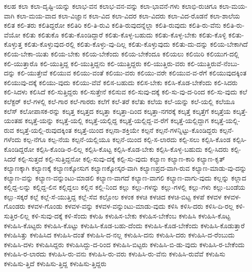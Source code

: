 {ಕಲಹ
ಕಲಾ
ಕಲಾ-ದೃಷ್ಟಿ-ಯನ್ನು
ಕಲಾಭ-ವನ
ಕಲಾಭ-ವನ-ವನ್ನು
ಕಲಾ-ಭಾವನೆ-ಗಳು
ಕಲಾಭಿ-ರುಚಿಗೂ
ಕಲಾ-ಮಯ-ವಾಗಿ
ಕಲಾ-ಮಯ-ವಾದ
ಕಲಾ-ವಿಜ್ಞಾನ
ಕಲಾ-ವಿದ
ಕಲಾ-ವಿದರ
ಕಲಾ-ವಿದರು
ಕಲಾ-ವಿದ-ರೊಡನೆ
ಕಲಾ-ಶಾಲೆಯ
ಕಲಿತ
ಕಲಿ-ತರು
ಕಲಿತಿದ್ದರೋ
ಕಲಿತಿರಿ
ಕಲಿ-ತಿ-ರುವಿ
ಕಲಿತಿ-ರುವುದನ್ನೆಲ್ಲಾ
ಕಲಿತಿ-ರುವುದು
ಕಲಿತಿ-ರು-ವೆನು
ಕಲಿತಿ-ರು-ವೆಯೋ
ಕಲಿತು
ಕಲಿತುಕೊ
ಕಲಿತು-ಕೊಂಡಿದ್ದಾರೆ
ಕಲಿತು-ಕೊಳ್ಳ-ಬಹುದು
ಕಲಿತು-ಕೊಳ್ಳ-ಬೇಕು
ಕಲಿತು-ಕೊಳ್ಳಿ
ಕಲಿತು-ಕೊಳ್ಳುತ್ತ
ಕಲಿತು-ಕೊಳ್ಳುವುದ-ರಲ್ಲಿ
ಕಲಿತು-ಕೊಳ್ಳು-ವು-ದಿಲ್ಲ
ಕಲಿತು-ಕೊಳ್ಳುವುದು
ಕಲಿತು-ದು-ದನ್ನು
ಕಲಿಯ-ಬೇಕಾಗಿದೆ
ಕಲಿಯ-ಬೇಕಾ-ಯಿತು
ಕಲಿಯ-ಬೇಕು
ಕಲಿಯ-ಬೇಕೆಂದು
ಕಲಿಯ-ಬೇಕೆಂದೂ
ಕಲಿಯಲು
ಕಲಿಯಿರಿ
ಕಲಿಯುಗ-ದಲ್ಲಿ
ಕಲಿ-ಯುತ್ತಾರೊ
ಕಲಿ-ಯುತ್ತಿದ್ದ
ಕಲಿ-ಯುತ್ತಿದ್ದನು
ಕಲಿ-ಯುತ್ತಿದ್ದರು
ಕಲಿ-ಯುತ್ತಿರು-ವರು
ಕಲಿ-ಯುತ್ತಿರುವೆ-ನೆಂಬು-ದನ್ನು
ಕಲಿ-ಯುತ್ತೇವೆ
ಕಲಿಯುವ
ಕಲಿಯು-ವಂತೆ
ಕಲಿಯು-ವರು
ಕಲಿಯು-ವರೇ
ಕಲಿಯುವ-ವ-ರೆಗೆ
ಕಲಿಯುವುದಕ್ಕಿಂತ
ಕಲಿಯುವು-ದಕ್ಕೆ
ಕಲಿಯು-ವುದು
ಕಲಿಯು-ವೆವೆ
ಕಲಿಸ-ಬಹುದು
ಕಲಿಸ-ಬೇಕು
ಕಲಿಸಿ-ಕೊಡ-ಬೇಕೆಂದು
ಕಲಿ-ಸಿದರು
ಕಲಿ-ಸಿದಳು
ಕಲಿಸಿದೆ
ಕಲಿ-ಸುತ್ತಿದ್ದರು
ಕಲಿ-ಸುತ್ತೇನೆ
ಕಲಿಸುವ
ಕಲಿ-ಸುವು-ದಕ್ಕೆ
ಕಲಿ-ಸು-ವು-ದ-ರಿಂದ
ಕಲಿ-ಸು-ವುದು
ಕಲೆ
ಕಲೆಕ್ಟರ್
ಕಲೆ-ಗಳಲ್ಲಿ
ಕಲೆ-ಗಾರ
ಕಲೆ-ಗಾರರು
ಕಲೆಗೆ
ಕಲೆ-ತರೆ
ಕಲೆತು
ಕಲೆಯ
ಕಲೆ-ಯನ್ನು
ಕಲೆ-ಯಲ್ಲಿ
ಕಲೆಯೂ
ಕಲೆಸ್
ಕಲೋಪಾಸಕ-ರನ್ನು
ಕಲ್ಕತ್ತ
ಕಲ್ಕತ್ತದ
ಕಲ್ಕತ್ತಾ
ಕಲ್ಕತ್ತಾ-ದಿಂದ
ಕಲ್ಕತ್ತಾ-ನಗರಕ್ಕೆ
ಕಲ್ಕತ್ತೆ
ಕಲ್ಕತ್ತೆಗೆ
ಕಲ್ಕತ್ತೆಯ
ಕಲ್ಕತ್ತೆ-ಯಂತಹ
ಕಲ್ಕತ್ತೆ-ಯನ್ನು
ಕಲ್ಕತ್ತೆ-ಯಲ್ಲಿ
ಕಲ್ಕತ್ತೆ-ಯಲ್ಲಿದ್ದ
ಕಲ್ಕತ್ತೆ-ಯಲ್ಲಿದ್ದ-ವ-ರೆಗೆ
ಕಲ್ಕತ್ತೆ-ಯಲ್ಲಿದ್ದಾಗ
ಕಲ್ಕತ್ತೆ-ಯಲ್ಲಿ-ರುವ
ಕಲ್ಕತ್ತೆ-ಯಲ್ಲಿ-ರುವುದಕ್ಕಿಂತ
ಕಲ್ಕತ್ತೆ-ಯಿಂದ
ಕಲ್ಪನಾ-ಶಕ್ತಿಯೇ
ಕಲ್ಪನೆ
ಕಲ್ಪನೆ-ಗಳನ್ನಿಟ್ಟು-ಕೊಂಡಿದ್ದರು
ಕಲ್ಪನೆ-ಗಳೆಂದು
ಕಲ್ಪ-ನೆಗೂ
ಕಲ್ಪ-ನೆಯ
ಕಲ್ಪನೆ-ಯಲ್ಲಿಯೂ
ಕಲ್ಪನೆ-ಯಿಂದ
ಕಲ್ಪಿ-ಸ-ಲಾರದು
ಕಲ್ಪಿ-ಸಲು
ಕಲ್ಪಿಸಿ-ಕೊಂಡ
ಕಲ್ಪಿಸಿ-ಕೊಂಡಿದ್ದರೋ
ಕಲ್ಪಿಸಿ-ಕೊಂಡಿ-ರ-ಲಿಲ್ಲ
ಕಲ್ಪಿಸಿ-ಕೊಟ್ಟ
ಕಲ್ಪಿಸಿ-ಕೊಡ-ಬೇಕು
ಕಲ್ಪಿಸಿ-ಕೊಳ್ಳ-ಬಹುದು
ಕಲ್ಪಿ-ಸಿದರು
ಕಲ್ಪಿ-ಸಿದರೆ
ಕಲ್ಪಿ-ಸುತ್ತದೆ
ಕಲ್ಪಿ-ಸುತ್ತಿದ್ದನೋ
ಕಲ್ಪಿ-ಸುವು-ದಕ್ಕೆ
ಕಲ್ಪಿ-ಸು-ವುದು
ಕಲ್ಯಾಣ
ಕಲ್ಯಾಣ-ಕಾರಿ
ಕಲ್ಯಾಣ-ಕೃತ್
ಕಲ್ಯಾಣಕ್ಕಾಗಿ
ಕಲ್ಯಾಣಕ್ಕೆ
ಕಲ್ಯಾಣಕ್ಕೋಸುಗ
ಕಲ್ಯಾಣಕ್ಕೋಸ್ಕರ-ವಾಗಿ
ಕಲ್ಯಾಣಪ್ರದ-ವಾಗಿ-ರುವ
ಕಲ್ಯಾಣ-ಮಾಡು-ವು-ದನ್ನು
ಕಲ್ಯಾಣ-ವನ್ನು
ಕಲ್ಯಾಣ-ವನ್ನುಂಟು-ಮಾಡಲಿ
ಕಲ್ಯಾಣ-ವಾಗದೆ
ಕಲ್ಯಾಣ-ವಾಗಲಿ
ಕಲ್ಯಾಣ-ವಾಗು-ವುದು
ಕಲ್ಲನ್ನು
ಕಲ್ಲಾದ
ಕಲ್ಲಿದ್ದ-ಲನ್ನು
ಕಲ್ಲಿದ್ದ-ಲಿನ
ಕಲ್ಲಿದ್ದಲು
ಕಲ್ಲಿನ
ಕಲ್ಲಿ-ನಿಂದ
ಕಲ್ಲು
ಕಲ್ಲು-ಗಳನ್ನು
ಕಲ್ಲು-ಗಳಲ್ಲಿ
ಕಲ್ಲು-ಗಳು
ಕಲ್ಲು-ಬಂಡೆಯ
ಕಲ್ಲು-ಸಕ್ಕರೆ
ಕಲ್ಲೆ
ಕಲ್ಲೆ-ಸೆ-ಯುತ್ತಿದ್ದ
ಕಲ್ಲೆ-ಸೆವ
ಕಲ್ಲೋಲ
ಕಳಂಕ
ಕಳಚಿ
ಕಳಚಿದ
ಕಳಚಿ-ಬಿಟ್ಟ
ಕಳಪೆ
ಕಳವಳ
ಕಳವಳ-ಗೊಂಡರು
ಕಳವಳ-ಗೊಂಡು
ಕಳವಳ-ವನ್ನು
ಕಳವಳ-ವನ್ನುಂಟು-ಮಾಡು-ವುದು
ಕಳಿಸಿ
ಕಳಿಸಿ-ದರು
ಕಳಿಸಿ-ದಿ-ರಲ್ಲ
ಕಳಿ-ಸುತ್ತಿರ-ಲಿಲ್ಲ
ಕಳಿ-ಸುವು-ದಕ್ಕೆ
ಕಳಿ-ಸೆಂದು
ಕಳುಹಿ
ಕಳುಹಿಸ-ಬೇಕು
ಕಳುಹಿಸ-ಬೇಕೆಂಬ
ಕಳುಹಿಸಿ
ಕಳುಹಿಸಿ-ಕೊಟ್ಟ
ಕಳುಹಿಸಿ-ಕೊಟ್ಟರು
ಕಳುಹಿಸಿ-ಕೊಟ್ಟು
ಕಳುಹಿಸಿ-ಕೊಡ-ಬಹು-ದೆಂದು
ಕಳುಹಿಸಿ-ಕೊಡ-ಬೇಕೆಂದು
ಕಳುಹಿಸಿ-ಕೊಡುತ್ತಾರೆ
ಕಳುಹಿಸಿತ್ತು
ಕಳುಹಿಸಿದ
ಕಳುಹಿಸಿ-ದಂತೆ
ಕಳುಹಿಸಿ-ದ-ನಲ್ಲ
ಕಳುಹಿಸಿ-ದನು
ಕಳುಹಿಸಿ-ದರು
ಕಳುಹಿಸಿ-ದ-ರೆಂಬುದು
ಕಳುಹಿಸಿ-ದಳು
ಕಳುಹಿಸಿದ್ದರು
ಕಳುಹಿಸಿದ್ದು-ದ-ರಿಂದ
ಕಳುಹಿಸಿ-ಬಿಟ್ಟರು
ಕಳುಹಿಸಿ-ಬಿ-ಡು-ವುದು
ಕಳುಹಿಸಿ-ರ-ಬೇಕೆಂದು
ಕಳುಹಿಸಿ-ರ-ಲಾರದು
ಕಳುಹಿಸಿ-ರು-ವನು
ಕಳುಹಿಸಿ-ರು-ವರು
ಕಳುಹಿಸಿ-ರು-ವೆನು
ಕಳುಹಿಸಿ-ರುವೆವೆ
ಕಳುಹಿಸು
ಕಳುಹಿಸು-ತ್ತಿದೆ
ಕಳುಹಿಸು-ತ್ತಿದ್ದ
ಕಳುಹಿಸು-ತ್ತಿದ್ದರು
}
